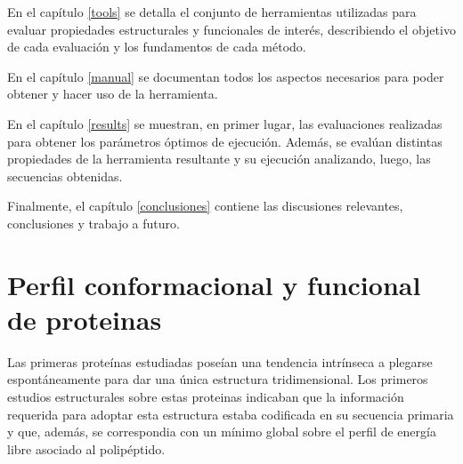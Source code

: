 En el capítulo \ref{tools} se detalla el conjunto de herramientas utilizadas para evaluar propiedades estructurales y funcionales de interés, describiendo el objetivo de cada evaluación y los fundamentos de cada método. 

En el capítulo \ref{manual} se documentan todos los aspectos necesarios para poder obtener y hacer uso de la herramienta.

En el capítulo \ref{results} se muestran, en primer lugar, las evaluaciones realizadas para obtener los parámetros óptimos de ejecución. 
Además, se evalúan distintas propiedades de la herramienta resultante y su ejecución analizando, luego, las secuencias obtenidas. 

Finalmente, el capítulo \ref{conclusiones} contiene las discusiones relevantes, conclusiones y trabajo a futuro.































\section{Perfil conformacional y funcional de proteinas}\label{proteinLandscape}


Las primeras proteínas estudiadas poseían una tendencia intrínseca a plegarse espontáneamente para dar una única estructura tridimensional.
Los primeros estudios estructurales sobre estas proteinas indicaban que la información requerida para adoptar esta estructura estaba codificada en su secuencia primaria y que, además, se correspondia con un mínimo global sobre el
perfil de energía libre asociado al polipéptido.  

